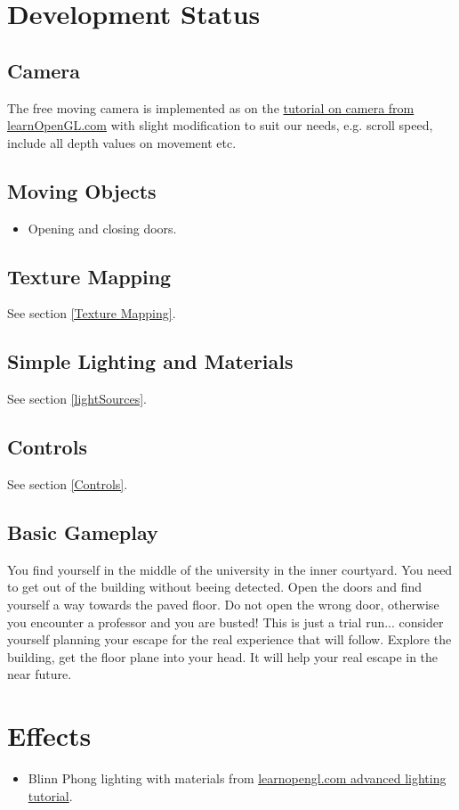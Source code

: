 \documentclass[12pt]{article}
\begin{document}
\section{Development Status}
\subsection{Camera}
The free moving camera is implemented as on the \href{http://www.learnopengl.com/#!Getting-started/Camera}{tutorial on camera from learnOpenGL.com} with slight modification to suit our needs, e.g. scroll speed, include all depth values on movement etc.

\subsection{Moving Objects}
\begin{itemize}
\item Opening and closing doors.
\end{itemize}

\subsection{Texture Mapping}
See section \ref{Texture Mapping}.
\subsection{Simple Lighting and Materials}
See section \ref{lightSources}.
\subsection{Controls}
See section \ref{Controls}.
\subsection{Basic Gameplay}
You find yourself in the middle of the university in the inner courtyard. You need to get out of the building without beeing detected. Open the doors and find yourself a way towards the paved floor. Do not open the wrong door, otherwise you encounter a professor and you are busted!
This is just a trial run... consider yourself planning your escape for the real experience that will follow. Explore the building, get the floor plane into your head. It will help your real escape in the near future.


\section{Effects}
\begin{itemize}
	\item Blinn Phong lighting with materials from \href{http://learnopengl.com/#!Advanced-Lighting/Advanced-Lighting}{learnopengl.com advanced lighting tutorial}.
\end{itemize}
\end{document}
